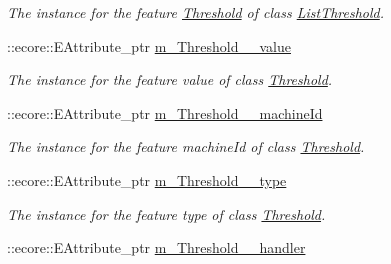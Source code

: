 \begin{DoxyCompactItemize}
\begin{DoxyCompactList}\small\item\em The instance for the feature \hyperlink{classIMS__Data_1_1Threshold}{Threshold} of class \hyperlink{classIMS__Data_1_1ListThreshold}{ListThreshold}. \item\end{DoxyCompactList}\item 
\hypertarget{classIMS__Data_1_1IMS__DataPackage_aa3555ae186e25222d826bbcc9fbd83c8}{
::ecore::EAttribute\_\-ptr \hyperlink{classIMS__Data_1_1IMS__DataPackage_aa3555ae186e25222d826bbcc9fbd83c8}{m\_\-Threshold\_\-\_\-value}}
\label{classIMS__Data_1_1IMS__DataPackage_aa3555ae186e25222d826bbcc9fbd83c8}

\begin{DoxyCompactList}\small\item\em The instance for the feature value of class \hyperlink{classIMS__Data_1_1Threshold}{Threshold}. \item\end{DoxyCompactList}\item 
\hypertarget{classIMS__Data_1_1IMS__DataPackage_a5b11063c520170393ce8e46688636ef0}{
::ecore::EAttribute\_\-ptr \hyperlink{classIMS__Data_1_1IMS__DataPackage_a5b11063c520170393ce8e46688636ef0}{m\_\-Threshold\_\-\_\-machineId}}
\label{classIMS__Data_1_1IMS__DataPackage_a5b11063c520170393ce8e46688636ef0}

\begin{DoxyCompactList}\small\item\em The instance for the feature machineId of class \hyperlink{classIMS__Data_1_1Threshold}{Threshold}. \item\end{DoxyCompactList}\item 
\hypertarget{classIMS__Data_1_1IMS__DataPackage_a2bef907dfd4e737c311371cf8772219d}{
::ecore::EAttribute\_\-ptr \hyperlink{classIMS__Data_1_1IMS__DataPackage_a2bef907dfd4e737c311371cf8772219d}{m\_\-Threshold\_\-\_\-type}}
\label{classIMS__Data_1_1IMS__DataPackage_a2bef907dfd4e737c311371cf8772219d}

\begin{DoxyCompactList}\small\item\em The instance for the feature type of class \hyperlink{classIMS__Data_1_1Threshold}{Threshold}. \item\end{DoxyCompactList}\item 
\hypertarget{classIMS__Data_1_1IMS__DataPackage_a40e9aaba849bfb5414abcbc6ccc11df1}{
::ecore::EAttribute\_\-ptr \hyperlink{classIMS__Data_1_1IMS__DataPackage_a40e9aaba849bfb5414abcbc6ccc11df1}{m\_\-Threshold\_\-\_\-handler}}
\label{classIMS__Data_1_1IMS__DataPackage_a40e9aaba849bfb5414abcbc6ccc11df1}


\end{DoxyCompactItemize}
